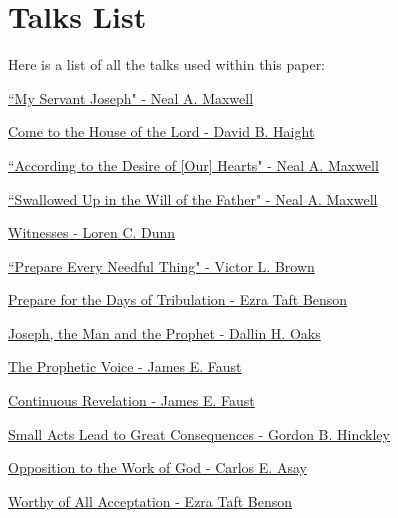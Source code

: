 \section{Talks List}
Here is a list of all the talks used within this paper:

\href{https://www.lds.org/general-conference/1992/04/my-servant-joseph?lang=eng}{``My Servant Joseph" - Neal A. Maxwell}

\href{https://www.lds.org/general-conference/1992/04/come-to-the-house-of-the-lord?lang=eng}{Come to the House of the Lord - David B. Haight}

\href{https://www.lds.org/general-conference/1996/10/according-to-the-desire-of-our-hearts?lang=eng}{``According to the Desire of [Our] Hearts" - Neal A. Maxwell }

\href{https://www.lds.org/general-conference/1995/10/swallowed-up-in-the-will-of-the-father?lang=eng}{``Swallowed Up in the Will of the Father" - Neal A. Maxwell}

\href{https://www.lds.org/general-conference/1995/10/witnesses?lang=eng}{Witnesses - Loren C. Dunn}

\href{https://www.lds.org/general-conference/1980/10/prepare-every-needful-thing?lang=eng}{``Prepare Every Needful Thing" - Victor L. Brown}

\href{https://www.lds.org/general-conference/1980/10/prepare-for-the-days-of-tribulation?lang=eng}{Prepare for the Days of Tribulation - Ezra Taft Benson}

\href{https://www.lds.org/general-conference/1996/04/joseph-the-man-and-the-prophet?lang=eng}{Joseph, the Man and the Prophet - Dallin H. Oaks}

\href{https://www.lds.org/general-conference/1996/04/the-prophetic-voice?lang=eng}{The Prophetic Voice - James E. Faust}

\href{https://www.lds.org/general-conference/1989/10/continuous-revelation?lang=eng}{Continuous Revelation - James E. Faust}

\href{https://www.lds.org/general-conference/1984/04/small-acts-lead-to-great-consequences?lang=eng}{Small Acts Lead to Great Consequences - Gordon B. Hinckley}

\href{https://www.lds.org/general-conference/1981/10/opposition-to-the-work-of-god?lang=eng}{Opposition to the Work of God - Carlos E. Asay}

\href{https://www.lds.org/general-conference/1978/10/worthy-of-all-acceptation?lang=eng}{Worthy of All Acceptation - Ezra Taft Benson}

